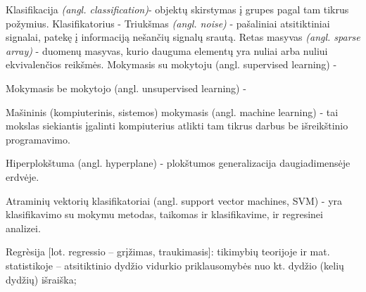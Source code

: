 Klasifikacija \textit{(angl. classification)}- objektų skirstymas į grupes pagal tam tikrus požymius.
Klasifikatorius - 
Triukšmas \textit{(angl. noise)} - pašaliniai atsitiktiniai signalai, patekę į informaciją nešančių signalų srautą.
Retas masyvas \textit{(angl. sparse array)} - duomenų masyvas, kurio dauguma elementų yra nuliai arba nuliui ekvivalenčios reikšmės.
Mokymasis su mokytoju (angl. supervised learning) - %

Mokymasis be mokytojo (angl. unsupervised learning) - %

Mašininis\cite{mamcenko08} (kompiuterinis, sistemos\cite{martisiute08})
mokymasis (angl. machine learning) - tai mokslas siekiantis įgalinti
kompiuterius atlikti tam tikrus darbus be išreikštinio programavimo.

Hiperplokštuma (angl. hyperplane) - plokštumos generalizacija daugiadimensėje
erdvėje.

Atraminių vektorių klasifikatoriai (angl. support vector machines, SVM) - yra
klasifikavimo su mokymu metodas, taikomas ir klasifikavime, ir regresinei
analizei.\cite{bernataviciene08}

Regrèsija [lot. regressio – grįžimas, traukimasis]: tikimybių teorijoje ir mat.
statistikoje – atsitiktinio dydžio vidurkio priklausomybės nuo kt. dydžio (kelių
dydžių) išraiška;\cite{tzz2010}
